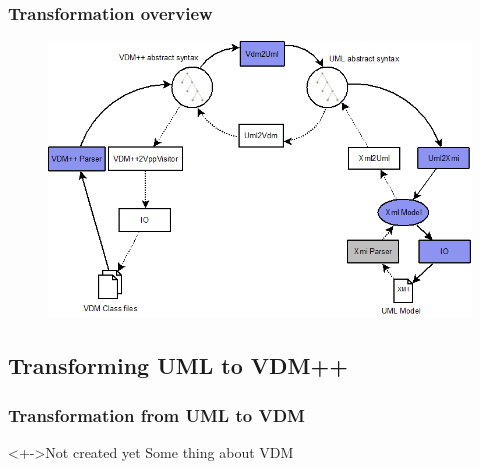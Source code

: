 %
%
\frame
{
  \frametitle{Transformation overview}
\begin{center}
\begin{figure}
\includegraphics[width=\textwidth]{images/OverviewOverMappingToVDM4.png}
\end{figure}
\end{center}
}

\subsection{Transforming UML to VDM++}
%
%
\frame
{
  \frametitle{Transformation from UML to VDM}

\begin{center}
	\begin{block}<+->{Not created yet}
	Some thing about VDM
	\end{block}

\end{center}
}



